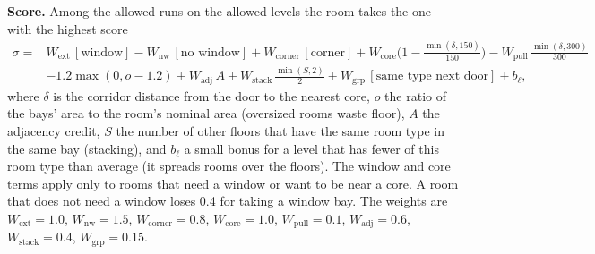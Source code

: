 \documentclass[10pt,a4paper]{article}
\begin{document}
\textbf{Score.} Among the allowed runs on the allowed levels the room takes the one with the highest score
\begin{align*} \sigma ={}& W_{\text{ext}}\,[\text{window}] - W_{\text{nw}}\,[\text{no window}] + W_{\text{corner}}\,[\text{corner}]
+ W_{\text{core}}\Big(1 - \tfrac{\min(\delta,150)}{150}\Big) - W_{\text{pull}}\,\tfrac{\min(\delta,300)}{300} \\
&- 1.2\max(0, o - 1.2) + W_{\text{adj}}\,A + W_{\text{stack}}\,\tfrac{\min(S,2)}{2} + W_{\text{grp}}\,[\text{same type next door}] + b_\ell ,
\end{align*}
where $\delta$ is the corridor distance from the door to the nearest core, $o$ the ratio of the bays' area to the
room's nominal area (oversized rooms waste floor), $A$ the adjacency credit, $S$ the number of other floors that have
the same room type in the same bay (stacking), and $b_\ell$ a small bonus for a level that has fewer of this room type
than average (it spreads rooms over the floors). The window and core terms apply only to rooms that need a window or
want to be near a core. A room that does not need a window loses 0.4 for taking a window bay. The weights are
$W_{\text{ext}} = 1.0$, $W_{\text{nw}} = 1.5$, $W_{\text{corner}} = 0.8$, $W_{\text{core}} = 1.0$,
$W_{\text{pull}} = 0.1$, $W_{\text{adj}} = 0.6$, $W_{\text{stack}} = 0.4$, $W_{\text{grp}} = 0.15$.
\end{document}
